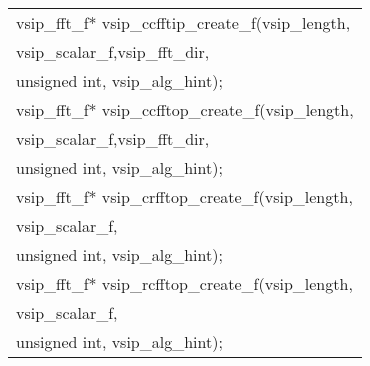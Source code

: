 {\begin{tabular}[H]{l}
vsip\_fft\_f* vsip\_ccfftip\_create\_f(vsip\_length,\\*\hspace{.7cm}vsip\_scalar\_f,vsip\_fft\_dir,\\*\hspace{.7cm}unsigned int, vsip\_alg\_hint);\vspace{.1cm}\\
vsip\_fft\_f* vsip\_ccfftop\_create\_f(vsip\_length,\\*\hspace{.7cm}vsip\_scalar\_f,vsip\_fft\_dir,\\*\hspace{.7cm}unsigned int, vsip\_alg\_hint);\vspace{.1cm}\\
vsip\_fft\_f* vsip\_crfftop\_create\_f(vsip\_length,\\*\hspace{.7cm}vsip\_scalar\_f,\\*\hspace{.7cm}unsigned int, vsip\_alg\_hint);\vspace{.1cm}\\
vsip\_fft\_f* vsip\_rcfftop\_create\_f(vsip\_length,\\*\hspace{.7cm}vsip\_scalar\_f,\\*\hspace{.7cm}unsigned int, vsip\_alg\_hint);\vspace{.1cm}\\
\end{tabular}
}
